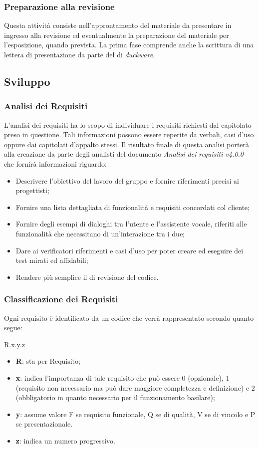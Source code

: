 \subsubsection{Preparazione alla revisione}
Questa attività consiste nell'approntamento del materiale da presentare in ingresso alla revisione ed eventualmente la preparazione del materiale per l'esposizione, quando prevista. La prima fase comprende anche la scrittura di una lettera di presentazione da parte del  di \emph{duckware}.
\subsection{Sviluppo}
\label{sec:sviluppo}
\subsubsection{Analisi dei Requisiti}
L’analisi dei requisiti ha lo scopo di individuare i requisiti richiesti dal capitolato preso in questione. Tali informazioni possono essere reperite da verbali, casi d’uso oppure dai capitolati d’appalto stessi. Il risultato finale di questa analisi porterà alla creazione da parte degli analisti del documento \emph{Analisi dei requisiti v4.0.0} che fornirà informazioni riguardo:
\begin{itemize}
	\item Descrivere l’obiettivo del lavoro del gruppo e fornire riferimenti precisi ai progettisti;
	\item Fornire una lista dettagliata di funzionalità e requisiti concordati col  cliente;
	\item Fornire degli esempi di dialoghi tra l'utente e l'assistente vocale, riferiti alle funzionalità che necessitano di un'interazione tra i due;
	\item Dare ai verificatori riferimenti e casi d’uso per poter creare ed eseguire dei test mirati ed affidabili;
	\item Rendere più semplice il  di revisione del codice.
\end{itemize}
\subsubsection{Classificazione dei Requisiti}
Ogni requisito è identificato da un codice che verrà rappresentato secondo quanto segue:
\begin{center}
	R.{x}.{y}.{z}
\end{center}
\begin{itemize}
	\item \textbf{R}: sta per Requisito;
	\item \textbf{x}: indica l’importanza di tale requisito che può essere 0 (opzionale), 1 (requisito non necessario ma può dare maggiore completezza e definizione) e 2 (obbligatorio in quanto necessario per il funzionamento basilare);
	\item \textbf{y}: assume valore F se requisito funzionale, Q se di qualità, V se di vincolo e P se presentazionale.
	\item \textbf{z}: indica un numero progressivo.
\end{itemize}
